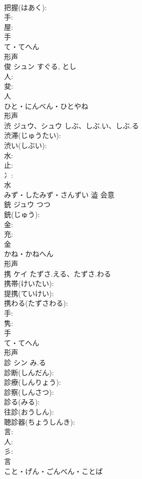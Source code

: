 \documentclass[8pt]{extreport}
\begin{document}
\begin{CJK}{UTF8}{min}
\\	把握(はあく): 
\\	手: 
\\	屋: 
\\	手	
\\	て・てへん	
\\	形声 
\\	俊	シュン		すぐる, とし	
\\	人: 
\\	夋: 
\\	人	
\\	ひと・にんべん・ひとやね	
\\	形声 
\\	渋	ジュウ、シュウ	しぶ、しぶ.い、しぶ.る		
\\	渋滞(じゅうたい): 
\\	渋い(しぶい): 
\\	水: 
\\	止: 
\\	冫: 
\\	水	
\\	みず・したみず・さんずい	澁	会意 
\\	銃	ジュウ	つつ		
\\	銃(じゅう): 
\\	金: 
\\	充: 
\\	金	
\\	かね・かねへん	
\\	形声 
\\	携	ケイ	たずさ.える、たずさ.わる		
\\	携帯(けいたい): 
\\	提携(ていけい): 
\\	携わる(たずさわる): 
\\	手: 
\\	隽: 
\\	手	
\\	て・てへん	
\\	形声 
\\	診	シン	み.る		
\\	診断(しんだん): 
\\	診療(しんりょう): 
\\	診察(しんさつ): 
\\	診る(みる): 
\\	往診(おうしん): 
\\	聴診器(ちょうしんき): 
\\	言: 
\\	人: 
\\	彡: 
\\	言	
\\	こと・げん・ごんべん・ことば	

\end{CJK}
\end{document}
